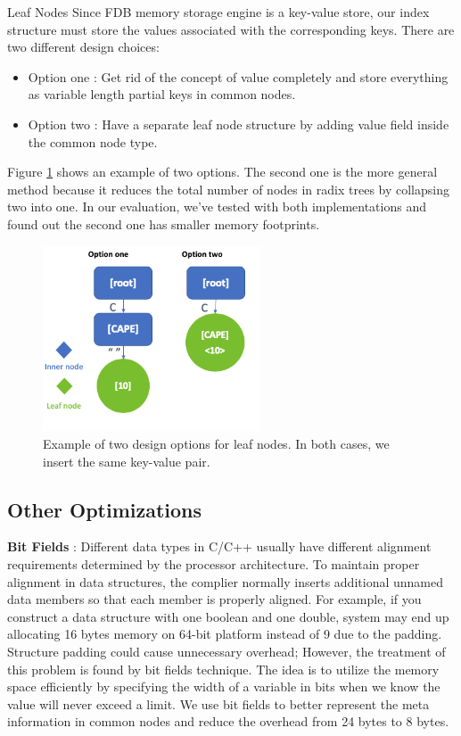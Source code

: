 \documentclass[sigplan,screen,nonacm]{acmart}
\makeatletter
\def\subsubsection{\@startsection{subsubsection}{3}%
  \z@{.5\linespacing\@plus.7\linespacing}{.1\linespacing}%
  {\normalfont\itshape}}
\makeatother
\begin{document}
\subsubsection{Leaf Nodes}
Since FDB memory storage engine is a key-value store, our index structure must store the values associated with the corresponding keys. There are two different design choices: 
\begin{itemize}
    \item Option one : Get rid of the concept of value completely and store everything as variable length partial keys in common nodes. 
    \item Option two : Have a separate leaf node structure by adding value field inside the common node type. 
\end{itemize}
Figure \ref{fig:leaf-nodes} shows an example of two options. The second one is the more general method because it reduces the total number of nodes in radix trees by collapsing two into one. In our evaluation, we’ve tested with both implementations and found out the second one has smaller memory footprints. 
\begin{figure}[h]
  \centering
  \includegraphics[width=\linewidth, height=5.5cm]{pic/leaf nodes.png}
  \setlength{\belowcaptionskip}{-10pt} 
  \caption{Example of two design options for leaf nodes. In both cases, we insert the same key-value pair.}
  \label{fig:leaf-nodes}
\end{figure}

\subsection{Other Optimizations}
\textbf {Bit Fields} : Different data types in C/C++ usually have different alignment requirements determined by the processor architecture. To maintain proper alignment in data structures, the complier normally inserts additional unnamed data members so that each member is properly aligned. For example, if you construct a data structure with one boolean and one double, system may end up allocating 16 bytes memory on 64-bit platform instead of 9 due to the padding. Structure padding could cause unnecessary overhead; However, the treatment of this problem is found by bit fields technique. The idea is to utilize the memory space efficiently by specifying the width of a variable in bits when we know the value will never exceed a limit. We use bit fields to better represent the meta information in common nodes and reduce the overhead from 24 bytes to 8 bytes.
\end{document}
